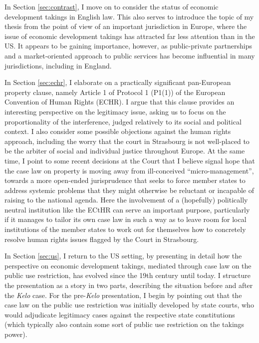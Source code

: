 {In Section \ref{sec:contrast}, I move on to consider the status of economic development takings in  English law. This also serves to introduce the topic of my thesis from the point of view of an important jurisdiction in Europe, where the issue of economic development takings has attracted far less attention than in the US. It appears to be gaining importance, however, as public-private partnerships and a market-oriented approach to public services has become influential in many jurisdictions, including in England.

In Section \ref{sec:echr}, I elaborate on a practically significant pan-European property clause, namely Article 1 of Protocol 1 (P1(1)) of the European Convention of Human Rights (ECHR). I argue that this clause provides an interesting perspective on the legitimacy issue, asking us to focus on the proportionality of the interference, judged relatively to its social and political context. I also consider some possible objections against the human rights approach, including the worry that the court in Strasbourg is not well-placed to be the arbiter of social and individual justice throughout Europe. At the same time, I point to some recent decisions at the Court that I believe signal hope that the case law on property is moving away from ill-conceived ``micro-management'', towards a more open-ended jurisprudence that seeks to force member states to address systemic problems that they might otherwise be reluctant or incapable of raising to the national agenda. Here the involvement of a (hopefully) politically neutral institution like the ECtHR can serve an important purpose, particularly if it manages to tailor its own case law in such a way as to leave room for local institutions of the member states to work out for themselves how to concretely resolve human rights issues flagged by the Court in Strasbourg.

In Section \ref{sec:us}, I return to the US setting, by presenting in detail how the perspective on economic development takings, mediated through case law on the public use restriction, has evolved since the 19th century until today. I structure the presentation as a story in two parts, describing the situation before and after the {\it Kelo} case. For the pre-{\it Kelo} presentation, I begin by pointing out that the case law on the public use restriction was initially developed by state courts, who would adjudicate legitimacy cases against the respective state constitutions (which typically also contain some sort of public use restriction on the takings power). 

}
